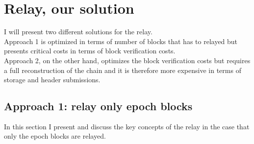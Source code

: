 \section{Relay, our solution}

I will present two different solutions for the relay. \\Approach 1 is optimized in terms of number of blocks that has to relayed but presents critical costs in terms of block verification costs. \\Approach 2, on the other hand, optimizes the block verification costs but requires a full reconstruction of the chain and it is therefore more expensive in terms of storage and header submissions.

\noindent
\subsection{Approach 1: relay only epoch blocks}
In this section I present and discuss the key concepts of the relay in the case that only the epoch blocks are relayed.\\

